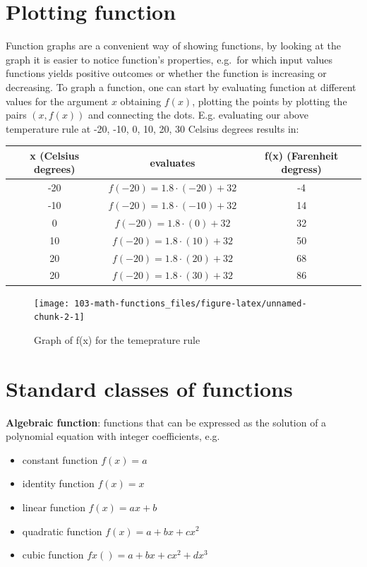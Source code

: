 \documentclass[
]{book}
\providecommand{\tightlist}{%
  \setlength{\itemsep}{0pt}\setlength{\parskip}{0pt}}
\theoremstyle{definition}
\theoremstyle{definition}
\theoremstyle{definition}
\theoremstyle{remark}
\begin{document}
\hypertarget{plotting-function}{%
\section{Plotting function}\label{plotting-function}}

Function graphs are a convenient way of showing functions, by looking at the graph it is easier to notice function's properties, e.g.~for which input values functions yields positive outcomes or whether the function is increasing or decreasing. To graph a function, one can start by evaluating function at different values for the argument \(x\) obtaining \(f(x)\), plotting the points by plotting the pairs \((x, f(x))\) and connecting the dots. E.g. evaluating our above temperature rule at -20, -10, 0, 10, 20, 30 Celsius degrees results in:

\begin{longtable}[]{@{}ccc@{}}
\toprule
x (Celsius degrees) & evaluates & f(x) (Farenheit degress)\tabularnewline
\midrule
\endhead
-20 & \(f(-20) = 1.8 \cdot (-20) + 32\) & -4\tabularnewline
-10 & \(f(-20) = 1.8 \cdot (-10) + 32\) & 14\tabularnewline
0 & \(f(-20) = 1.8 \cdot (0) + 32\) & 32\tabularnewline
10 & \(f(-20) = 1.8 \cdot (10) + 32\) & 50\tabularnewline
20 & \(f(-20) = 1.8 \cdot (20) + 32\) & 68\tabularnewline
20 & \(f(-20) = 1.8 \cdot (30) + 32\) & 86\tabularnewline
\bottomrule
\end{longtable}

\begin{figure}

{\centering \texttt{[image: 103-math-functions\_files/figure-latex/unnamed-chunk-2-1]} 

}

\caption{Graph of f(x) for the temeprature rule}\label{fig:unnamed-chunk-2}
\end{figure}

\hypertarget{standard-classes-of-functions}{%
\section{Standard classes of functions}\label{standard-classes-of-functions}}

\textbf{Algebraic function}: functions that can be expressed as the solution of a polynomial equation with integer coefficients, e.g.~

\begin{itemize}
\tightlist
\item
  constant function \(f(x) = a\)
\item
  identity function \(f(x) = x\)
\item
  linear function \(f(x) = ax + b\)
\item
  quadratic function \(f(x) = a + bx + cx^2\)
\item
  cubic function \(fx() = a + bx + cx^2 + dx^3\)
\end{itemize}
\end{document}
